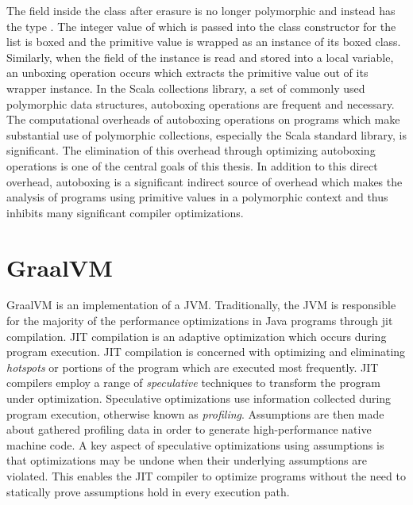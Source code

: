The  field inside the  class after erasure is no longer polymorphic and instead has the type . 
The integer value of  which is passed into the class constructor for the list is boxed and the primitive value is wrapped as an instance of its boxed class.
Similarly, when the  field of the instance is read and stored into a local variable, an unboxing operation occurs which extracts the primitive value out of its wrapper instance.
In the Scala collections library, a set of commonly used polymorphic data structures, autoboxing operations are frequent and necessary.
The computational overheads of autoboxing operations on programs which make substantial use of polymorphic collections, especially the Scala standard library, is significant\cite{scala:collections-optimization}.
The elimination of this overhead through optimizing autoboxing operations is one of the central goals of this thesis.
In addition to this direct overhead, autoboxing is a significant indirect source of overhead which makes the analysis of programs using primitive values in a polymorphic context and thus inhibits many significant compiler optimizations.

\section{GraalVM}

GraalVM\cite{java:graalvm} is an implementation of a JVM.
Traditionally, the JVM is responsible for the majority of the performance optimizations in Java programs\cite{java:hotspot} through \acrfull{jit} compilation.
JIT compilation is an adaptive optimization which occurs during program execution.
JIT compilation is concerned with optimizing and eliminating \textit{hotspots} or portions of the program which are executed most frequently.
JIT compilers\cite{java:sablevm}\cite{java:jikesrvm} employ a range of \textit{speculative} techniques to transform the program under optimization.
Speculative optimizations use information collected during program execution, otherwise known as \textit{profiling}. 
Assumptions are then made about gathered profiling data in order to generate high-performance native machine code.
A key aspect of speculative optimizations using assumptions is that optimizations may be undone when their underlying assumptions are violated.
This enables the JIT compiler to optimize programs without the need to statically prove assumptions hold in every execution path.

